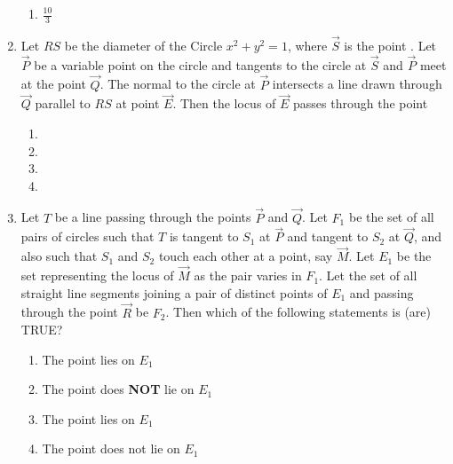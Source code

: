 \begin{enumerate}
\begin{multicols}{2}
\begin{enumerate}[label=(\alph*),  start=16, itemsep=1ex]
 \item $\frac{10}{3}$                         
 \end{enumerate}
\end{multicols}
%
\item Let $RS$ be the diameter of the Circle $x^{2} + y^{2} = 1$,  where $\vec{S}$ is the point . Let $\vec{P}$ be a variable point  on the circle and tangents to the circle at $\vec{S}$ and $\vec{P}$ meet at the point $\vec{Q}$. The normal to the circle at $\vec{P}$ intersects a line drawn through $\vec{Q}$ parallel to $RS$ at point $\vec{E}$. Then the locus of $\vec{E}$ passes through the point
%

\hfill {}
\begin{multicols}{4}
\begin{enumerate}
	\item {}
	\item {}
	\item {}
	\item {}
\end{enumerate}
\end{multicols}
\item Let $T$ be a line passing through the points $\vec{P}$ and $\vec{Q}$. Let $F_1$ be the set of all pairs of circles  such that $T$ is tangent to $S_1$ at $\vec{P}$ and tangent to $S_2$ at $\vec{Q}$,  and also such that $S_1$ and $S_2$ touch each other at a point,  say $\vec{M}$. Let $E_1$ be the set representing the locus of $\vec{M}$ as the pair  varies in $F_1$. Let the set of all straight line segments joining a pair of distinct points of $E_1$ and passing through the point $\vec{R}$ be $F_2$. Then which of the following statements is (are) TRUE?
%
\hfill{}
\begin{multicols}{2}
\begin{enumerate}
\item The point  lies on $E_1$
\item The point  does \textbf{NOT} lie on $E_1$
\item The point  lies on $E_1$
\item The point  does not lie on $E_1$
\end{enumerate}

\end{multicols}
\end{enumerate}
